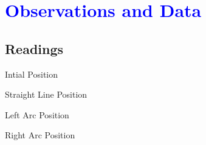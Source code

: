 \documentclass[10pt,a4paper]{article}
\begin{document}
				\section{\textcolor{blue}{Observations and Data}}
					\subsection{Readings}
						\begin{table}[H]
							\centering
							
							\caption{Intial Position}
						\end{table}
						\begin{table}[H]
							\centering
							
							\caption{Straight Line Position}
						\end{table}
						\begin{table}[H]
							\centering
							
							\caption{Left Arc Position}
						\end{table}
						\begin{table}[H]
							\centering
							
							\caption{Right Arc Position}
						\end{table}
\end{document}
